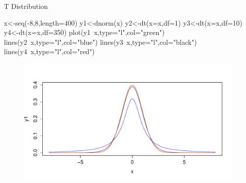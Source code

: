 \documentclass[handout]{beamer}
\begin{document}
\begin{frame}[fragile]{T Distribution}
 \scriptsize{



\begin{verbatim*}
x<-seq(-8,8,length=400)
y1<-dnorm(x)
y2<-dt(x=x,df=1)
y3<-dt(x=x,df=10)
y4<-dt(x=x,df=350)
plot(y1~x,type="l",col="green")
lines(y2~x,type="l",col="blue")
lines(y3~x,type="l",col="black")
lines(y4~x,type="l",col="red")

\end{verbatim*}

 \begin{figure}[h!]
	\centering
	\includegraphics[scale=0.3]{pics/tstudent.pdf}
\end{figure}


}
\end{frame}
\end{document}
